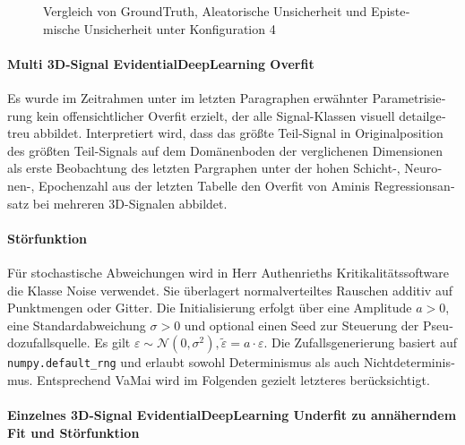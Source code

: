 \begin{otherlanguage}{ngerman}
\begin{figure}[!ht]
  \caption{Vergleich von \gls{GroundTruth}, \gls{Aleatorische Unsicherheit} und \gls{Epistemische Unsicherheit} unter Konfiguration 4}
  \label{fig:three_subfigures3}
\end{figure}



\paragraph{Multi 3D-Signal \gls{EvidentialDeepLearning} Overfit} Es wurde im Zeitrahmen unter im letzten Paragraphen erwähnter Parametrisierung kein offensichtlicher Overfit erzielt, der alle Signal-Klassen visuell detailgetreu abbildet. Interpretiert wird, dass das größte Teil-Signal in Originalposition des größten Teil-Signals auf dem Domänenboden der verglichenen Dimensionen als erste Beobachtung des letzten Pargraphen unter der hohen Schicht-, Neuronen-, Epochenzahl aus der letzten Tabelle den Overfit von Aminis Regressionsansatz bei mehreren 3D-Signalen abbildet.  



\paragraph{Störfunktion} Für stochastische Abweichungen wird in Herr Authenrieths Kritikalitätssoftware die Klasse Noise verwendet. Sie überlagert normalverteiltes Rauschen additiv auf Punktmengen oder Gitter. Die Initialisierung erfolgt über eine Amplitude \( a > 0 \), eine Standardabweichung \( \sigma > 0 \) und optional einen Seed zur Steuerung der Pseudozufallsquelle. Es gilt $\varepsilon \sim \mathcal{N}(0, \sigma^2), \tilde{\varepsilon} = a \cdot \varepsilon$. Die Zufallsgenerierung basiert auf \texttt{numpy.default\_rng} und erlaubt sowohl Determinismus als auch Nichtdeterminismus. Entsprechend VaMai wird im Folgenden gezielt letzteres berücksichtigt.



\paragraph{Einzelnes 3D-Signal \gls{EvidentialDeepLearning} Underfit zu annäherndem Fit und Störfunktion} 


\end{otherlanguage}
